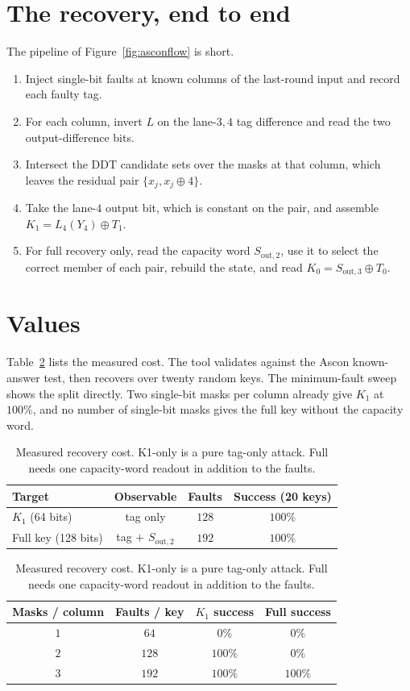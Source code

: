\documentclass[11pt]{article}
\begin{document}


\section{The recovery, end to end}
The pipeline of Figure~\ref{fig:asconflow} is short.
\begin{enumerate}
\item Inject single-bit faults at known columns of the last-round input and
      record each faulty tag.
\item For each column, invert $L$ on the lane-$3,4$ tag difference and read the
      two output-difference bits.
\item Intersect the DDT candidate sets over the masks at that column, which
      leaves the residual pair $\{x_j, x_j \oplus 4\}$.
\item Take the lane-$4$ output bit, which is constant on the pair, and assemble
      $K_1 = L_4(Y_4) \oplus T_1$.
\item For full recovery only, read the capacity word $S_{\text{out},2}$, use it
      to select the correct member of each pair, rebuild the state, and read
      $K_0 = S_{\text{out},3} \oplus T_0$.
\end{enumerate}

\section{Values}
Table~\ref{tab:results} lists the measured cost. The tool validates against the
Ascon known-answer test, then recovers over twenty random keys. The
minimum-fault sweep shows the split directly. Two single-bit masks per column
already give $K_1$ at $100\%$, and no number of single-bit masks gives the full
key without the capacity word.

\begin{table}[t]
\centering
\caption{Measured recovery cost. K1-only is a pure tag-only attack. Full needs
one capacity-word readout in addition to the faults.}
\label{tab:results}
\begin{tabular}{lccc}
\toprule
\textbf{Target} & \textbf{Observable} & \textbf{Faults} & \textbf{Success (20 keys)} \\
\midrule
$K_1$ (64 bits)        & tag only              & $128$ & $100\%$ \\
Full key (128 bits)    & tag $+$ $S_{\text{out},2}$ & $192$ & $100\%$ \\
\bottomrule
\end{tabular}

\vspace{0.5em}
\begin{tabular}{cccc}
\toprule
\textbf{Masks / column} & \textbf{Faults / key} & \textbf{$K_1$ success} & \textbf{Full success} \\
\midrule
$1$ & $64$  & $0\%$   & $0\%$   \\
$2$ & $128$ & $100\%$ & $0\%$   \\
$3$ & $192$ & $100\%$ & $100\%$ \\
\bottomrule
\end{tabular}
\end{table}
\end{document}
